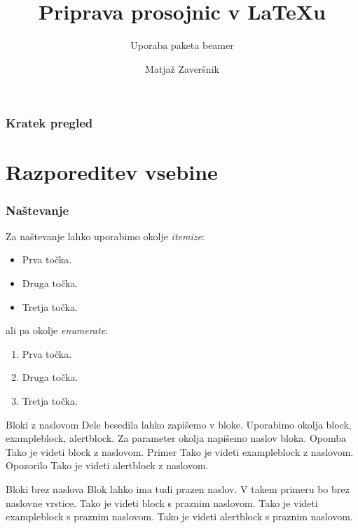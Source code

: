 \documentclass{beamer}
\title{Priprava prosojnic v {\LaTeX}u}
\subtitle{Uporaba paketa beamer}
\author{Matjaž Zaveršnik}
\institute{FMF Fakulteta za matematiko in fiziko}
\begin{document}
\frame{\titlepage}




\begin{frame}
   \frametitle{Kratek pregled}
      \tableofcontents%
       \section {Razporeditev vsebine}   
\end{frame}
\begin{frame}
   \frametitle{Naštevanje}
   Za naštevanje lahko uporabimo okolje \emph{itemize}:
      \begin{itemize}
         \item Prva točka.
         \item Druga točka.
         \item Tretja točka.
      \end{itemize}
   ali pa okolje \emph{enumerate}:
   \begin{enumerate}
      \item Prva točka.
      \item Druga točka.
      \item Tretja točka.
   \end{enumerate}
   \end{frame}

   Bloki z naslovom
   Dele besedila lahko zapišemo v bloke.
   Uporabimo okolja block, exampleblock, alertblock.
   Za parameter okolja napišemo naslov bloka.
   Opomba
      Tako je videti block z naslovom.
   Primer
      Tako je videti exampleblock z naslovom.
   Opozorilo
      Tako je videti alertblock z naslovom.


   Bloki brez naslova
   Blok lahko ima tudi prazen naslov.
   V takem primeru bo brez naslovne vrstice.
      Tako je videti block s praznim naslovom.
      Tako je videti exampleblock s praznim naslovom.
      Tako je videti alertblock s praznim naslovom.

\end{document}
